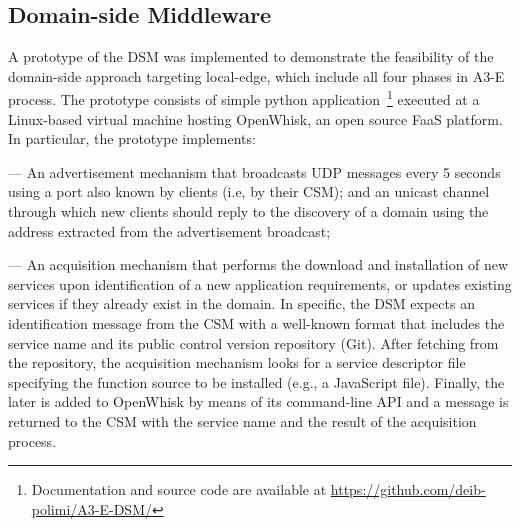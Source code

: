 \subsection{Domain-side Middleware}

A prototype of the DSM was implemented to demonstrate the feasibility of the domain-side approach targeting local-edge, which include all four phases in A3-E process. The prototype consists of simple python  application~\footnote{Documentation and source code are available at \url{https://github.com/deib-polimi/A3-E-DSM/}} executed at a Linux-based virtual machine hosting OpenWhisk, an open source FaaS platform. In particular, the prototype implements:

--- An advertisement mechanism that broadcasts UDP messages every 5 seconds using a port also known by clients (i.e, by their CSM); and an unicast channel through which new clients should reply to the discovery of a domain using the address extracted from the advertisement broadcast;

--- An acquisition mechanism that performs the download and installation of new services upon identification of a new application requirements, or updates existing services if they already exist in the domain. In specific, the DSM expects an identification message from the CSM with a well-known format that includes the service name and its public control version repository (Git). After fetching from the repository, the acquisition mechanism looks for a service descriptor file specifying the function source to be installed (e.g., a JavaScript file). Finally, the later is added to OpenWhisk by means of its command-line API and a message is returned to the CSM with the service name and the result of the acquisition process.


